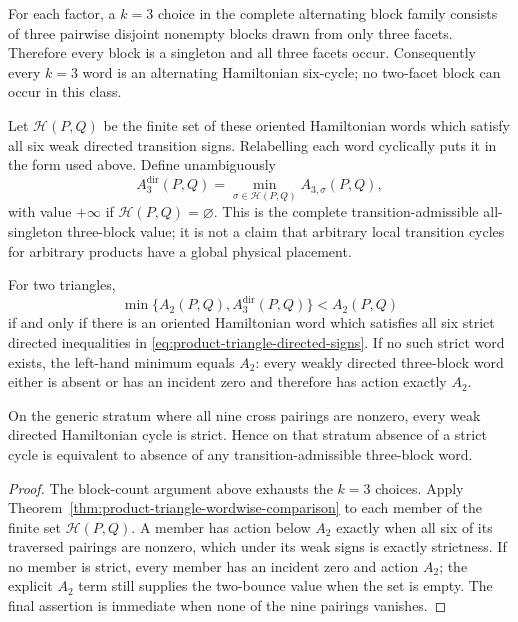 For each factor, a \(k=3\) choice in the complete alternating block family
consists of three pairwise disjoint nonempty blocks drawn from only three
facets.  Therefore every block is a singleton and all three facets occur.
Consequently every \(k=3\) word is an alternating Hamiltonian six-cycle; no
two-facet block can occur in this class.

Let \(\mathcal H(P,Q)\) be the finite set of these oriented Hamiltonian words
which satisfy all six weak directed transition signs.  Relabelling each word
cyclically puts it in the form used above.  Define unambiguously
\[
 A_3^{\mathrm{dir}}(P,Q)
 =\min_{\sigma\in\mathcal H(P,Q)}A_{3,\sigma}(P,Q),
\]
with value \(+\infty\) if \(\mathcal H(P,Q)=\varnothing\).  This is the
complete transition-admissible all-singleton three-block value; it is not a
claim that arbitrary local transition cycles for arbitrary products have a
global physical placement.

\begin{unverified}
\begin{corollary}
\label{cor:product-triangle-finite-classification}
For two triangles,
\begin{equation}
\label{eq:product-triangle-global-finite-classification}
 \min\{A_2(P,Q),A_3^{\mathrm{dir}}(P,Q)\}<A_2(P,Q)
\end{equation}
if and only if there is an oriented Hamiltonian word which satisfies all six
strict directed inequalities in
\eqref{eq:product-triangle-directed-signs}.  If no such strict word exists,
the left-hand minimum equals \(A_2\):
every weakly directed three-block word either is absent or has an incident
zero and therefore has action exactly \(A_2\).

On the generic stratum where all nine cross pairings are nonzero, every weak
directed Hamiltonian cycle is strict.  Hence on that stratum absence of a
strict cycle is equivalent to absence of any transition-admissible
three-block word.
\end{corollary}

\begin{proof}
The block-count argument above exhausts the \(k=3\) choices.  Apply
Theorem~\ref{thm:product-triangle-wordwise-comparison} to each member of the
finite set \(\mathcal H(P,Q)\).  A member has action below \(A_2\) exactly
when all six of its traversed pairings are nonzero, which under its weak signs
is exactly strictness.  If no member is strict, every member has an incident
zero and action \(A_2\); the explicit \(A_2\) term still supplies the
two-bounce value when the set is empty.  The final assertion is immediate
when none of the nine pairings vanishes.
\end{proof}
\end{unverified}

